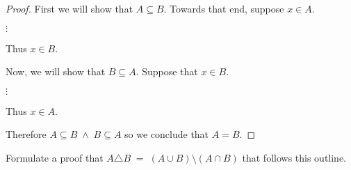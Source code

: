 \begin{enumerate}
\begin{proof} 
First we will show that $A \subseteq B$.\newline
Towards that end, suppose $x \in A$.

\begin{center}
$\vdots$
\end{center}

Thus $x \in B$.

Now, we will show that $B \subseteq A$. \newline
Suppose that $x \in B$.

\begin{center}
$\vdots$
\end{center}

Thus $x \in A$.

Therefore $A \subseteq B \; \land \; B \subseteq A$ so we conclude that $A=B$.
\end{proof}

Formulate a proof that $A \triangle B \; = \; (A \cup B) \setminus (A \cap B)$ that follows this outline.


\wbvfill

\workbookpagebreak

\end{enumerate}



